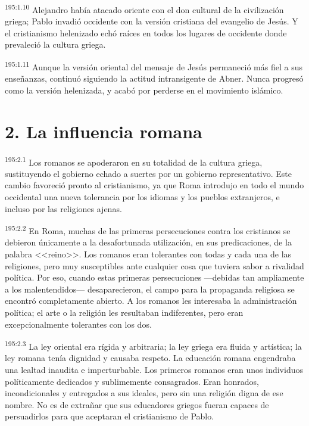 \par 
\textsuperscript{195:1.10} Alejandro había atacado oriente con el don cultural de la civilización griega; Pablo invadió occidente con la versión cristiana del evangelio de Jesús. Y el cristianismo helenizado echó raíces en todos los lugares de occidente donde prevaleció la cultura griega.

\par 
\textsuperscript{195:1.11} Aunque la versión oriental del mensaje de Jesús permaneció más fiel a sus enseñanzas, continuó siguiendo la actitud intransigente de Abner. Nunca progresó como la versión helenizada, y acabó por perderse en el movimiento islámico.

\section*{2. La influencia romana}
\par 
\textsuperscript{195:2.1} Los romanos se apoderaron en su totalidad de la cultura griega, sustituyendo el gobierno echado a suertes por un gobierno representativo. Este cambio favoreció pronto al cristianismo, ya que Roma introdujo en todo el mundo occidental una nueva tolerancia por los idiomas y los pueblos extranjeros, e incluso por las religiones ajenas.

\par 
\textsuperscript{195:2.2} En Roma, muchas de las primeras persecuciones contra los cristianos se debieron únicamente a la desafortunada utilización, en sus predicaciones, de la palabra <<reino>>. Los romanos eran tolerantes con todas y cada una de las religiones, pero muy susceptibles ante cualquier cosa que tuviera sabor a rivalidad política. Por eso, cuando estas primeras persecuciones ---debidas tan ampliamente a los malentendidos--- desaparecieron, el campo para la propaganda religiosa se encontró completamente abierto. A los romanos les interesaba la administración política; el arte o la religión les resultaban indiferentes, pero eran excepcionalmente tolerantes con los dos.

\par 
\textsuperscript{195:2.3} La ley oriental era rígida y arbitraria; la ley griega era fluida y artística; la ley romana tenía dignidad y causaba respeto. La educación romana engendraba una lealtad inaudita e imperturbable. Los primeros romanos eran unos individuos políticamente dedicados y sublimemente consagrados. Eran honrados, incondicionales y entregados a sus ideales, pero sin una religión digna de ese nombre. No es de extrañar que sus educadores griegos fueran capaces de persuadirlos para que aceptaran el cristianismo de Pablo.

